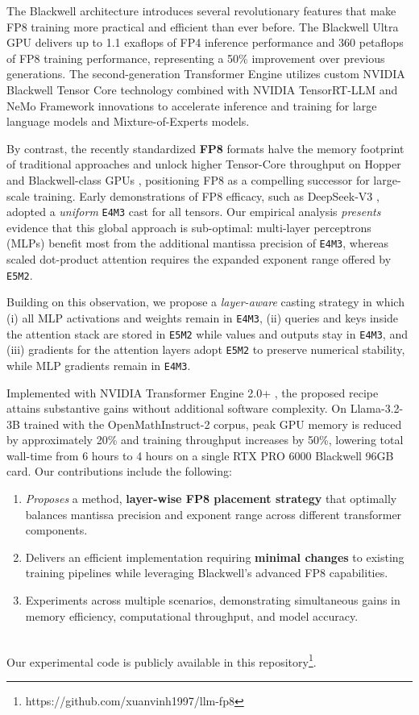 \documentclass[conference]{IEEEtran}
\begin{document}
The Blackwell architecture introduces several revolutionary features that make FP8 training more practical and efficient than ever before. The Blackwell Ultra GPU delivers up to 1.1 exaflops of FP4 inference performance and 360 petaflops of FP8 training performance, representing a 50\% improvement over previous generations. The second-generation Transformer Engine utilizes custom NVIDIA Blackwell Tensor Core technology combined with NVIDIA TensorRT-LLM and NeMo Framework innovations to accelerate inference and training for large language models and Mixture-of-Experts models. 

By contrast, the recently standardized \textbf{FP8} formats halve the memory footprint of traditional approaches and unlock higher Tensor-Core throughput on Hopper and Blackwell-class GPUs \cite{nvidiaH100_whitepaper}, positioning FP8 as a compelling successor for large-scale training. Early demonstrations of FP8 efficacy, such as DeepSeek-V3 \cite{deepseekv3}, adopted a \emph{uniform} \texttt{E4M3} cast for all tensors. Our empirical analysis \emph{presents} evidence that this global approach is sub-optimal: multi-layer perceptrons (MLPs) benefit most from the additional mantissa precision of \texttt{E4M3}, whereas scaled dot-product attention requires the expanded exponent range offered by \texttt{E5M2}. 

Building on this observation, we propose a \emph{layer-aware} casting strategy in which (i) all MLP activations and weights remain in \texttt{E4M3}, (ii) queries and keys inside the attention stack are stored in \texttt{E5M2} while values and outputs stay in \texttt{E4M3}, and (iii) gradients for the attention layers adopt \texttt{E5M2} to preserve numerical stability, while MLP gradients remain in \texttt{E4M3}.

Implemented with NVIDIA Transformer Engine 2.0+ \cite{TE2025}, the proposed recipe attains substantive gains without additional software complexity. On Llama-3.2-3B\cite{meta2024llama3.2} trained with the OpenMathInstruct-2 corpus, peak GPU memory is reduced by approximately 20\% and training throughput increases by 50\%, lowering total wall-time from 6 hours to 4 hours on a single RTX PRO 6000 Blackwell 96GB card. Our contributions include the following:

\begin{enumerate}
\item \emph{Proposes} a method, \textbf{layer-wise FP8 placement strategy} that optimally balances mantissa precision and exponent range across different transformer components.
\item Delivers an efficient implementation requiring \textbf{minimal changes} to existing training pipelines while leveraging Blackwell's advanced FP8 capabilities.
\item Experiments across multiple scenarios, demonstrating simultaneous gains in memory efficiency, computational throughput, and model accuracy.
\end{enumerate}\\
Our experimental code is publicly available in this repository\footnote{https://github.com/xuanvinh1997/llm-fp8}.
\end{document}
